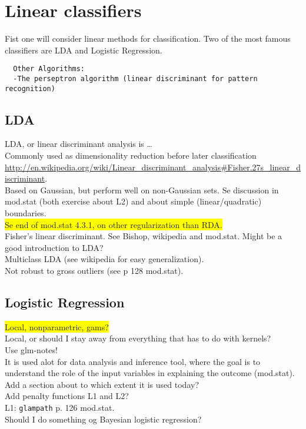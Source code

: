 \documentclass[11pt,a4paper]{article}
\begin{document}
\section{Linear classifiers}
\label{sec:Linear classifiers}
Fist one will consider linear methods for classification. Two of the most famous classifiers are LDA and Logistic Regression.
\begin{verbatim}
  Other Algorithms:
  -The perseptron algorithm (linear discriminant for pattern recognition)

\end{verbatim}
\subsection{LDA}
\label{sub:LDA}
LDA, or linear discriminant analysis is \ldots \\
Commonly used as dimensionality reduction before later classification \url{http://en.wikipedia.org/wiki/Linear_discriminant_analysis#Fisher.27s_linear_discriminant}.\\
Based on Gaussian, but perform well on non-Gaussian sets. Se discussion in mod.stat (both exercise about L2) and about simple (linear/quadratic) boundaries.\\
\colorbox{yellow}{Se end of mod.stat 4.3.1, on other regularization than RDA.}\\
Fisher's linear discriminant. See Bishop, wikipedia and mod.stat. Might be a good introduction to LDA? \\
Multiclass LDA (see wikipedia for easy generalization). \\
Not robust to gross outliers (see p 128 mod.stat).
%
\subsection{Logistic Regression}
\label{sub:Logistic Regression}
\colorbox{yellow}{Local, nonparametric, gams?}\\
Local, or should I stay away from everything that has to do with kernels? \\
Use glm-notes! \\
It is used alot for data analysis and inference tool, where the goal is to understand the role of the input variables in explaining the outcome (mod.stat).\\
Add a section about to which extent it is used today? \\
Add penalty functions L1 and L2? \\
L1: \verb+glampath+ p. 126 mod.stat.\\
Should I do something og Bayesian logistic regression?
%
\end{document}
